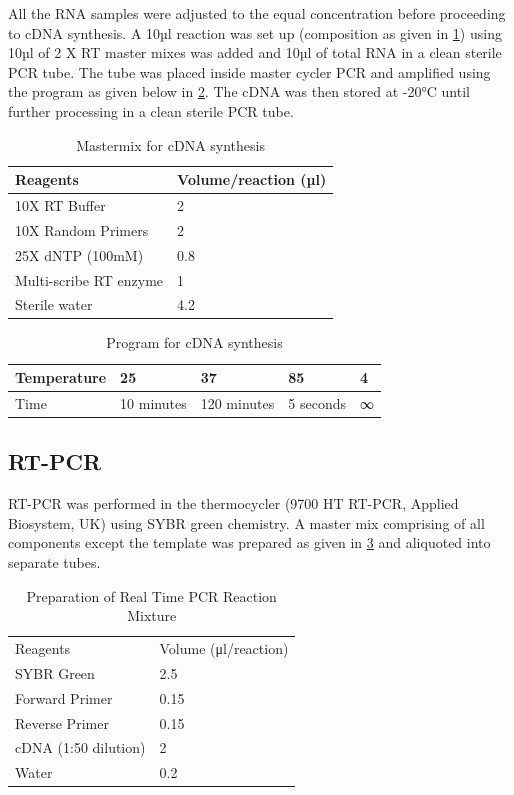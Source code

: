 All the RNA samples were adjusted to the equal concentration before proceeding to cDNA synthesis. A 10µl reaction was set up (composition as given in \cref{tab:2.4cdnamm}) using 10µl of 2 X RT master mixes was added and 10µl of total RNA in a clean sterile PCR tube. The tube was placed inside master cycler PCR and amplified using the program as given below in \cref{tab:2.5cdnaprog}. The cDNA was then stored at -20°C until further processing in a clean sterile PCR tube. 

\begin{table}[!h]
\centering
\caption{Mastermix for cDNA synthesis}
\label{tab:2.4cdnamm}
\begin{tabular}{ | l | l | }
\hline
	Reagents & Volume/reaction (µl) \\ \hline
	10X RT Buffer & 2 \\ \hline
	10X Random Primers & 2 \\ \hline
	25X dNTP (100mM) & 0.8 \\ \hline
	Multi-scribe RT enzyme & 1 \\ \hline
	Sterile water & 4.2 \\ \hline
\end{tabular}
\end{table}

\begin{table}[!h]
\centering
\caption{Program for cDNA synthesis}
\label{tab:2.5cdnaprog}
\begin{tabular}{ | l | l | l | l | l | }
\hline
	Temperature & 25 & 37 & 85 & 4 \\ \hline
	Time & 10 minutes & 120 minutes & 5 seconds & ∞ \\ \hline
\end{tabular}
\end{table}

\subsection{RT-PCR}
RT-PCR was performed in the thermocycler (9700 HT RT-PCR, Applied Biosystem, UK) using SYBR green chemistry. A master mix comprising of all components except the template was prepared as given in \cref{tab:2.6rtmm} and aliquoted into separate tubes. 

\begin{table}[!h]
\centering
\caption{Preparation of Real Time PCR Reaction Mixture}
\label{tab:2.6rtmm}
\begin{tabular}{ | l | l | }
\hline
	 &  \\ \hline
	Reagents & Volume (μl/reaction) \\ \hline
	SYBR Green & 2.5 \\ \hline
	Forward Primer & 0.15 \\ \hline
	Reverse Primer & 0.15 \\ \hline
	cDNA (1:50 dilution) & 2 \\ \hline
	Water & 0.2 \\ \hline
\end{tabular}
\end{table}

